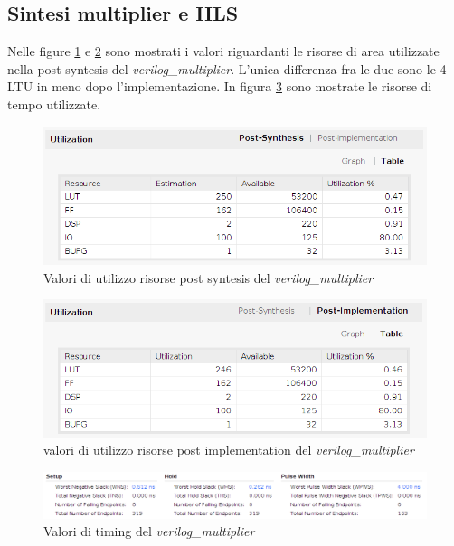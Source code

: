 \documentclass[]{IEEEtran}
\begin{document}
\subsection{Sintesi multiplier e HLS}
Nelle figure \ref{fig:UTIL_SYNT_VERILOG} e \ref{fig:UTIL_IMPL_VERILOG} sono mostrati i valori riguardanti le risorse di area utilizzate nella post-syntesis del \textit{verilog\_multiplier}. L'unica differenza fra le due sono le 4 LTU in meno dopo l'implementazione. In figura \ref{fig:TIMING_VERILOG} sono mostrate le risorse di tempo utilizzate.
\begin{figure}[!htb]
    \centering
    \includegraphics[width=0.9\linewidth]{figures/util_synt_verilog}
    \caption{Valori di utilizzo risorse post syntesis del \textit{verilog\_multiplier}}
    \label{fig:UTIL_SYNT_VERILOG}
\end{figure}
\begin{figure}[!htb]
    \centering
    \includegraphics[width=0.9\linewidth]{figures/util_impl_verilog}
    \caption{valori di utilizzo risorse post implementation del \textit{verilog\_multiplier}}
    \label{fig:UTIL_IMPL_VERILOG}
\end{figure}
\begin{figure}[!htb]
    \centering
    \includegraphics[width=1.0\linewidth]{figures/timing_verilog}
    \caption{Valori di timing del \textit{verilog\_multiplier}}
    \label{fig:TIMING_VERILOG}
\end{figure}
\end{document}

